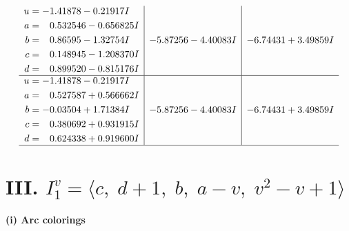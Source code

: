 \documentclass[1p]{elsarticle_modified}
\theoremstyle{definition}
\begin{document}
$$\begin{array}{c|c|c}
\begin{aligned}
u &= -1.41878 - 0.21917 I \\
a &= \phantom{-}0.532546 - 0.656825 I \\
b &= \phantom{-}0.86595 - 1.32754 I \\
c &= \phantom{-}0.148945 - 1.208370 I \\
d &= \phantom{-}0.899520 - 0.815176 I\end{aligned}
 & -5.87256 - 4.40083 I & -6.74431 + 3.49859 I \\ \hline\begin{aligned}
u &= -1.41878 - 0.21917 I \\
a &= \phantom{-}0.527587 + 0.566662 I \\
b &= -0.03504 + 1.71384 I \\
c &= \phantom{-}0.380692 + 0.931915 I \\
d &= \phantom{-}0.624338 + 0.919600 I\end{aligned}
 & -5.87256 - 4.40083 I & -6.74431 + 3.49859 I\\
 \hline 
 \end{array}$$\newpage\newpage\renewcommand{\arraystretch}{1}
\centering \section*{III. $I^v_{1}= \langle c,\;d+1,\;b,\;a- v,\;v^2- v+1 \rangle$}
\flushleft \textbf{(i) Arc colorings}\\
\end{document}
